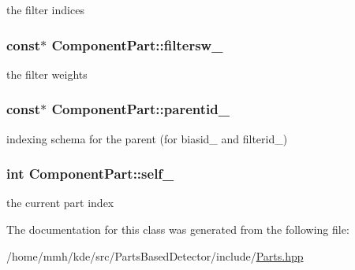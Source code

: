 the filter indices 

\hypertarget{classComponentPart_a301c8633b1e8db3f30436c0ba0fc140d}{
\subsubsection[{filtersw\-\_\-}]{ const$\ast$ Component\-Part\-::filtersw\-\_\-\hspace{0.3cm}{\ttfamily [private]}}}\label{classComponentPart_a301c8633b1e8db3f30436c0ba0fc140d}


the filter weights 

\hypertarget{classComponentPart_a3c75a843f04e4b3d56e4461f8ef803fa}{
\subsubsection[{parentid\-\_\-}]{ const$\ast$ Component\-Part\-::parentid\-\_\-\hspace{0.3cm}{\ttfamily [private]}}}\label{classComponentPart_a3c75a843f04e4b3d56e4461f8ef803fa}


indexing schema for the parent (for biasid\-\_\- and filterid\-\_\-) 

\hypertarget{classComponentPart_a814391cfc1e60223f270d06e3bf2f8b6}{
\subsubsection[{self\-\_\-}]{\setlength{\rightskip}{0pt plus 5cm}int Component\-Part\-::self\-\_\-\hspace{0.3cm}{\ttfamily [private]}}}\label{classComponentPart_a814391cfc1e60223f270d06e3bf2f8b6}


the current part index 



The documentation for this class was generated from the following file\-:\begin{DoxyCompactItemize}
\item 
/home/mmh/kde/src/\-Parts\-Based\-Detector/include/\hyperlink{Parts_8hpp}{Parts.\-hpp}\end{DoxyCompactItemize}
